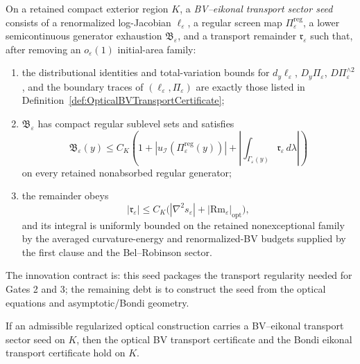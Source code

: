 \begin{definition}\label{def:BVEikonalTransportSectorSeed}
On a retained compact exterior region $K$, a \emph{BV--eikonal transport sector seed} consists of a renormalized log-Jacobian $\ell_\varepsilon$, a regular screen map $\Pi_\varepsilon^{\mathrm{reg}}$, a lower semicontinuous generator exhaustion $\mathfrak B_\varepsilon$, and a transport remainder $\mathfrak r_\varepsilon$ such that, after removing an $o_\varepsilon(1)$ initial-area family:
\begin{enumerate}
    \item the distributional identities and total-variation bounds for $d_y\ell_\varepsilon$, $D_y\Pi_\varepsilon$, $D\Pi_\varepsilon^{\wedge2}$, and the boundary traces of $(\ell_\varepsilon,\Pi_\varepsilon)$ are exactly those listed in Definition~\ref{def:OpticalBVTransportCertificate};
    \item $\mathfrak B_\varepsilon$ has compact regular sublevel sets and satisfies
    \[
        \mathfrak B_\varepsilon(y)
        \le
        C_K\left(1+|u_{\mathscr I}(\Pi_\varepsilon^{\mathrm{reg}}(y))|
        +\left|\int_{\Gamma_\varepsilon(y)}\mathfrak r_\varepsilon\,d\lambda\right|\right)
    \]
    on every retained nonabsorbed regular generator;
    \item the remainder obeys
    \[
        |\mathfrak r_\varepsilon|
        \le
        C_K\bigl(|\nabla^2s_\varepsilon|+|\mathrm{Rm}_\varepsilon|_{\mathrm{opt}}\bigr),
    \]
    and its integral is uniformly bounded on the retained nonexceptional family by the averaged curvature-energy and renormalized-BV budgets supplied by the first clause and the Bel--Robinson sector.
\end{enumerate}
The innovation contract is: this seed packages the transport regularity needed for Gates 2 and 3; the remaining debt is to construct the seed from the optical equations and asymptotic/Bondi geometry.
\end{definition}

\begin{theorem}\label{thm:BVEikonalTransportSectorSeed}
If an admissible regularized optical construction carries a BV--eikonal transport sector seed on $K$, then the optical BV transport certificate and the Bondi eikonal transport certificate hold on $K$.
\end{theorem}


